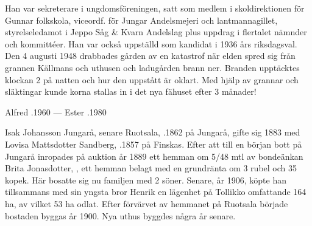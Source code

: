 Han var sekreterare i ungdomsföreningen, satt som medlem i skoldirektionen för Gunnar folkskola, viceordf. för Jungar Andelsmejeri och lantmannagillet, styrelseledamot i Jeppo Såg \& Kvarn Andelslag plus uppdrag i flertalet nämnder och kommittéer. Han var också uppställd som kandidat i 1936 års riksdagsval. Den 4 augusti 1948 drabbades gården av en katastrof när elden spred sig från grannen Källmans och uthusen och ladugården brann ner. Branden upptäcktes klockan 2 på natten och hur den uppstått är oklart. Med hjälp av grannar och släktingar kunde korna stallas in i det nya fähuset efter 3 månader!
\begin{jhchildren}
  \item {}
  \item {}
  \item {}
  \item {}
  \item {}
  \item {}
  \item {}
\end{jhchildren}

Alfred .1960  ---  Ester .1980


Isak Johansson Jungarå, senare Ruotsala, .1862 på Jungarå, gifte sig 1883 med Lovisa Mattsdotter Sandberg, .1857 på Finskas. Efter att till en början bott på Jungarå inropades på auktion år 1889 ett hemman om 5/48 mtl av bondeänkan Brita Jonasdotter, , ett hemman belagt med en grundränta om 3 rubel och 35 kopek. Här bosatte sig nu familjen med 2 söner. Senare, år 1906, köpte han tillsammans med sin yngsta bror Henrik en lägenhet på Tollikko omfattande 164 ha, av vilket 53 ha odlat. Efter förvärvet av hemmanet på Ruotsala började bostaden byggas år 1900. Nya uthus byggdes några år senare.

